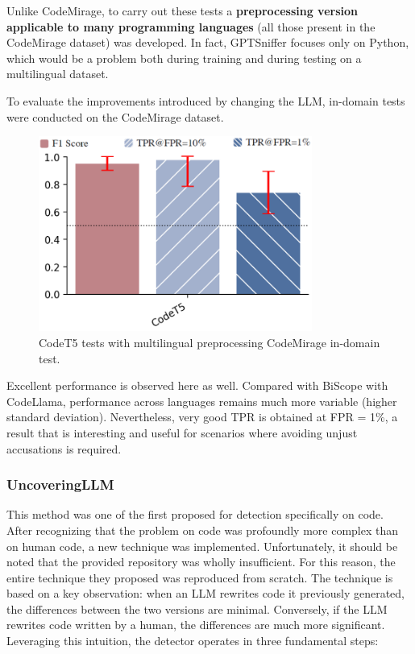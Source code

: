 Unlike CodeMirage, to carry out these tests a \textbf{preprocessing 
version applicable to many programming languages} (all those present in 
the CodeMirage dataset) was developed. In fact, GPTSniffer focuses only on 
Python, which would be a problem both during training and during testing on 
a multilingual dataset.

To evaluate the improvements introduced by changing the LLM, in-domain tests 
were conducted on the CodeMirage dataset.
\begin{figure}[H]
    \centering
    \includegraphics[width=0.8\textwidth]{img/CodeT5/default.png}
    \caption{CodeT5 tests with multilingual preprocessing CodeMirage in-domain test.}
    \label{fig:CodeT5 tests with multilingual preprocessing}
\end{figure}

Excellent performance is observed here as well. Compared with BiScope 
with CodeLlama, performance across languages remains much more variable 
(higher standard deviation). Nevertheless, very good TPR is obtained at FPR = 1\%, 
a result that is interesting and useful for scenarios where avoiding unjust 
accusations is required.



\subsubsection{UncoveringLLM}
This method was one of the first proposed for detection specifically on code. 
After recognizing that the problem on code was profoundly more complex than on 
human code, a new technique was implemented. Unfortunately, it should be noted 
that the provided repository was wholly insufficient. For this reason, the entire 
technique they proposed was reproduced from scratch.
The technique is based on a key observation: when an LLM rewrites code it previously 
generated, the differences between the two versions are minimal. Conversely, if the 
LLM rewrites code written by a human, the differences are much more significant. 
Leveraging this intuition, the detector operates in three fundamental steps:

